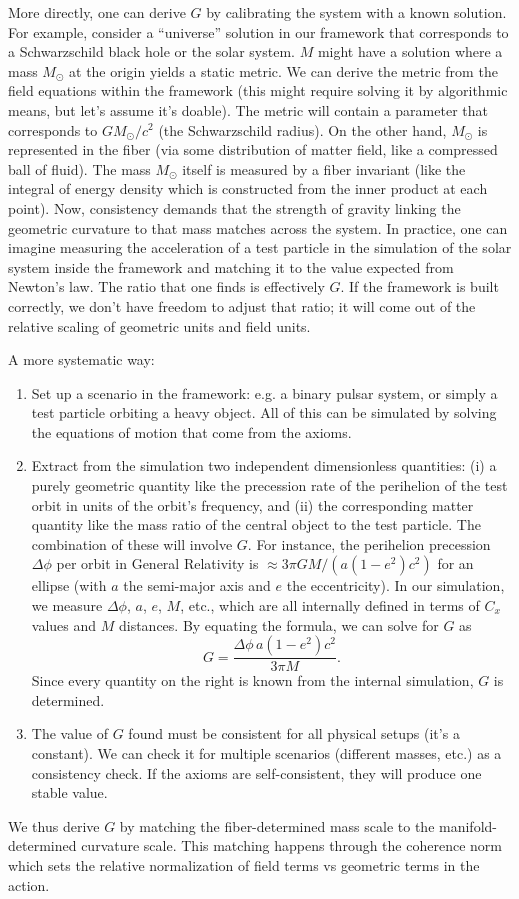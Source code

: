 \documentclass[11pt]{article}
\begin{document}
More directly, one can derive $G$ by calibrating the system with a known solution. For example, consider a ``universe'' solution in our framework that corresponds to a Schwarzschild black hole or the solar system. $M$ might have a solution where a mass $M_{\odot}$ at the origin yields a static metric. We can derive the metric from the field equations within the framework (this might require solving it by algorithmic means, but let's assume it's doable). The metric will contain a parameter that corresponds to $GM_{\odot}/c^2$ (the Schwarzschild radius). On the other hand, $M_{\odot}$ is represented in the fiber (via some distribution of matter field, like a compressed ball of fluid). The mass $M_{\odot}$ itself is measured by a fiber invariant (like the integral of energy density which is constructed from the inner product at each point). Now, consistency demands that the strength of gravity linking the geometric curvature to that mass matches across the system. In practice, one can imagine measuring the acceleration of a test particle in the simulation of the solar system inside the framework and matching it to the value expected from Newton's law. The ratio that one finds is effectively $G$. If the framework is built correctly, we don't have freedom to adjust that ratio; it will come out of the relative scaling of geometric units and field units.

A more systematic way:
\begin{enumerate}
    \item Set up a scenario in the framework: e.g. a binary pulsar system, or simply a test particle orbiting a heavy object. All of this can be simulated by solving the equations of motion that come from the axioms.
    \item Extract from the simulation two independent dimensionless quantities: (i) a purely geometric quantity like the precession rate of the perihelion of the test orbit in units of the orbit's frequency, and (ii) the corresponding matter quantity like the mass ratio of the central object to the test particle. The combination of these will involve $G$. For instance, the perihelion precession $\Delta\phi$ per orbit in General Relativity is $\approx 3\pi GM/(a(1-e^2)c^2)$ for an ellipse (with $a$ the semi-major axis and $e$ the eccentricity). In our simulation, we measure $\Delta\phi$, $a$, $e$, $M$, etc., which are all internally defined in terms of $C_x$ values and $M$ distances. By equating the formula, we can solve for $G$ as 
    \[
    G = \frac{\Delta\phi \, a (1-e^2)c^2}{3\pi M}.
    \] 
    Since every quantity on the right is known from the internal simulation, $G$ is determined.
    \item The value of $G$ found must be consistent for all physical setups (it's a constant). We can check it for multiple scenarios (different masses, etc.) as a consistency check. If the axioms are self-consistent, they will produce one stable value.
\end{enumerate}
We thus derive $G$ by matching the fiber-determined mass scale to the manifold-determined curvature scale. This matching happens through the coherence norm which sets the relative normalization of field terms vs geometric terms in the action.
\end{document}
